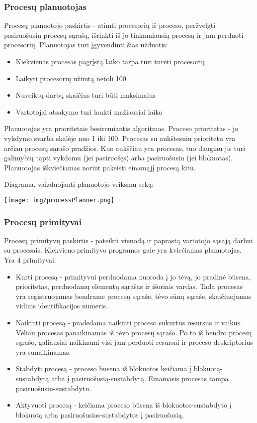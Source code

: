 \subsubsection{Procesų planuotojas}
Procesų planuotojo paskirtis - atimti procesorių iš proceso, peržvelgti pasiruošusių procesų sąrašą, išrinkti iš jo tinkamiausią procesą ir jam perduoti procesorių.
Planuotojas turi įgyvendinti šias užduotis:
	\begin{itemize}
		\item Kiekvienas procesas pagrįstą laiko tarpa turi turėti procesorių
		\item Laikyti procesorių užimtą netoli 100%
		\item Nuveiktų darbų skaičius turi būti maksimalus
		\item Vartotojai atsakymo turi laukti mažiausiai laiko
	\end{itemize}

Planuotojas yra prioritetais besiremiantis algoritmas. Proceso prioritetas - jo vykdymo svarba skalėje nuo 1 iki 100. Procesas su aukštesniu prioritetu yra arčiau procesų sąrašo pradžios.
Kuo aukščiau yra procesas, tuo daugiau jis turi galimybių tapti vykdomu (jei pasiruošęs) arba pasiruošusiu (jei blokuotas). Planuotojas iškviečiamas norint pakeisti einamąjį procesą kitu.

Diagrama, vaizduojanti planuotojo veiksmų seką:

\texttt{[image: img/processPlanner.png]}

\subsubsection{Procesų primityvai}
Procesų primityvų paskirtis - pateikti vienodą ir paprastą vartotojo sąsają darbui su procesais. Kiekvieno primityvo programos gale yra kviečiamas planuotojas. Yra 4 primityvai:
	\begin{itemize}
		\item Kurti procesą - primityvui perduodama nuoroda į jo tėvą, jo pradinė būsena, prioritetas, perduodamų elementų sąrašas ir išorinis vardas.
			Tada procesas yra registruojamas bendrame procesų sąraše, tėvo sūnų sąraše, skaičiuojamas vidinis identifikacijos numeris.
		\item Naikinti procesą - pradedama naikinti proceso sukurtus resursus ir vaikus. Vėliau procesas panaikinamas iš tėvo procesų sąrašo. Po to iš bendro procesų sąrašo, galiausiai
			naikinami visi jam perduoti resursai ir proceso deskriptorius yra sunaikinamas.
		\item Stabdyti procesą - proceso būsena iš blokuotos keičiama į blokuotą-sustabdytą arba į pasiruošusią-sustabdytą. Einamasis procesas tampa pasiruošusiu-sustabdytu.
		\item Aktyvuoti procesą - keičiama proceso būsena iš blokuotos-sustabdyto į blokuotą arba pasiruošusios-sustabdytos į pasiruošusią.
	\end{itemize}

